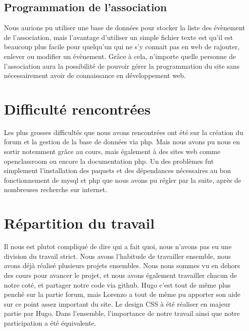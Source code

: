 \documentclass[a4paper, 12pt]{article}
\begin{document}
\subsection{Programmation de l'association}
Nous aurions pu utiliser une base de données pour stocker la liste des évènement de l'association, mais l'avantage d'utiliser un simple fichier texte est qu'il est beaucoup plus facile pour quelqu'un qui ne s'y connait pas en web de rajouter, enlever ou modifier un évènement. Grâce à cela, n'importe quelle personne de l'association aura la possibilité de pouvoir gérer la programmation du site sans nécessairement avoir de connaissance en développement web.

\section{Difficulté rencontrées}
Les plus grosses difficultés que nous avons rencontrées ont été sur la création du forum et la gestion de la base de données via php. Mais nous avons pu nous en sortir notemment grâce au cours, mais également à des sites web comme openclassroom ou encore la documentation php.
Un des problèmes fut simplement l'installation des paquets et des dépendances nécessaires au bon fonctionnement de mysql et php que nous avons pu régler par la suite, après de nombreuses recherche sur internet.

\section{Répartition du travail}
Il nous est plutot compliqué de dire qui a fait quoi, nous n'avons pas eu une division du travail strict. Nous avons l'habitude de travailler ensemble, nous avons déjà réalisé plusieurs projets ensembles. Nous nous sommes vu en dehors des cours pour avancer le projet, et nous avons également travailler chacun de notre coté, et partager notre code via github.
Hugo c'est tout de même plus penché sur la partie forum, mais Lorenzo a tout de même pu apporter son aide sur ce point assez important du site. Le design CSS à été réaliser en majeur partie par Hugo.
Dans l'ensemble, l'importance de notre travail ainsi que notre participation a été équivalente.
\end{document}
